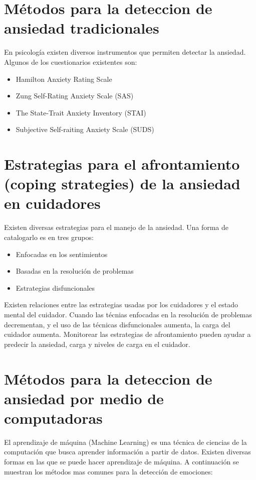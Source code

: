 \documentclass[letterpaper,12pt]{cicese}
\begin{document}
	\section{M\'etodos para la deteccion de ansiedad tradicionales}
	En psicolog\'ia existen diversos instrumentos que permiten detectar la ansiedad. Algunos de los cuestionarios existentes son:
	\begin{itemize}
		
		\item Hamilton Anxiety Rating Scale

		\item Zung Self-Rating Anxiety Scale (SAS)
				
		\item The State-Trait Anxiety Inventory (STAI)
		\item Subjective Self-raiting Anxiety Scale (SUDS)
	\end{itemize}

	\section{Estrategias para el afrontamiento (coping strategies) de la ansiedad en cuidadores}
	Existen diversas estrategias  para el manejo de la ansiedad. Una forma de catalogarlo es en tres grupos\citep{Cooper200615}:
	
		\begin{itemize}
			\item Enfocadas en los sentimientos
			\item Basadas en la resoluci\'on de problemas
			\item Estrategias disfuncionales
		\end{itemize}
	
	Existen  relaciones entre las estrategias usadas por los cuidadores y el estado mental del cuidador. Cuando las t\'ecnias enfocadas en la resoluci\'on de problemas decrementan, y el uso de las t\'ecnicas disfuncionales aumenta, la carga del cuidador aumenta. Monitorear las estrategias de afrontamiento pueden ayudar a predecir la ansiedad, carga y niveles de carga en el cuidador\citep{Tutar2013P484}. 
	\section{M\'etodos para la deteccion de ansiedad por medio de computadoras}
		El aprendizaje de m\'aquina (Machine Learning) es una t\'ecnica de ciencias de la computaci\'on que busca aprender informaci\'on a partir de datos.
		Existen diversas formas en las que se puede hacer aprendizaje de m\'aquina. A continuaci\'on se muestran los m\'etodos mas comunes para la detecci\'on de emociones:
\end{document}
